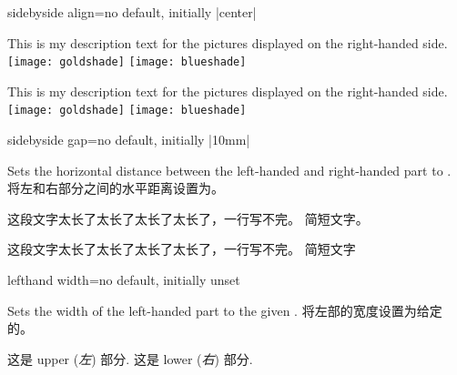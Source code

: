 \begin{docTcbKey}[][doc updated=2015-02-06]{sidebyside align}{=}{no default, initially |center|}
\begin{dispExample}
\begin{tcolorbox}[adjusted title=top seam,sidebyside align=top seam]
  This is my description text for the pictures displayed on the right-handed side.
  \tcblower
  \texttt{[image: goldshade]}%
  \texttt{[image: blueshade]}
\end{tcolorbox}

\begin{tcolorbox}[adjusted title=bottom seam,sidebyside align=bottom seam]
  This is my description text for the pictures displayed on the right-handed side.
  \tcblower
  \texttt{[image: goldshade]}%
  \texttt{[image: blueshade]}
\end{tcolorbox}
\end{dispExample}
\end{docTcbKey}

\begin{docTcbKey}{sidebyside gap}{=}{no default, initially |10mm|}
\begin{stripedbox}
Sets the horizontal distance between the left-handed and right-handed part to .
\tcblower
将左和右部分之间的水平距离设置为。
\end{stripedbox}

\begin{dispExample}

\begin{tcolorbox}[adjusted title=宽gap,sidebyside gap=30mm]
这段文字太长了太长了太长了太长了，一行写不完。
\tcblower
简短文字。
\end{tcolorbox}\hfill
\begin{tcolorbox}[adjusted title=窄gap,sidebyside gap=1mm]
这段文字太长了太长了太长了太长了，一行写不完。
\tcblower
简短文字
\end{tcolorbox}
\end{dispExample}
\end{docTcbKey}


\begin{docTcbKey}{lefthand width}{=}{no default, initially unset}
\begin{stripedbox}
Sets the width of the left-handed part to the given .
\tcblower
将左部的宽度设置为给定的。
\end{stripedbox}

\begin{dispExample}

\begin{tcolorbox}[title=My title,sidebyside,lefthand width=3cm]
这是 upper (\textit{左}) 部分.
\tcblower
这是 lower (\textit{右}) 部分.
\end{tcolorbox}
\end{dispExample}
\end{docTcbKey}

